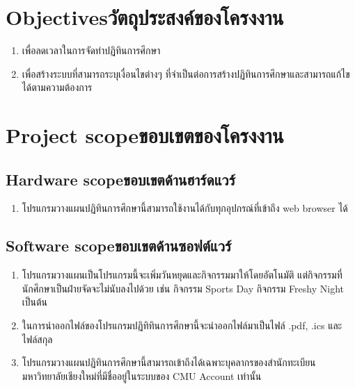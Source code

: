 \section{\ifenglish Objectives\else วัตถุประสงค์ของโครงงาน\fi}
\begin{enumerate}
    \item เพื่อลดเวลาในการจัดทำปฏิทินการศึกษา
    \item เพื่อสร้างระบบที่สามารถระบุเงื่อนไขต่างๆ ที่จำเป็นต่อการสร้างปฏิทินการศึกษาและสามารถแก้ไขได้ตามความต้องการ
\end{enumerate}

\section{\ifenglish Project scope\else ขอบเขตของโครงงาน\fi}

\subsection{\ifenglish Hardware scope\else ขอบเขตด้านฮาร์ดแวร์\fi}
\begin{enumerate}
\item โปรแกรมวางแผนปฏิทินการศึกษานี้สามารถใช้งานได้กับทุกอุปกรณ์ที่เข้าถึง web browser ได้ 
\end{enumerate}

\subsection{\ifenglish Software scope\else ขอบเขตด้านซอฟต์แวร์\fi}
\begin{enumerate}
\item โปรแกรมวางแผนเป็นโปรแกรมนี้จะเพิ่มวันหยุดและกิจกรรมมาให้โดยอัตโนมัติ แต่กิจกรรมที่นักศึกษาเป็นฝ่ายจัดจะไม่นับลงไปด้วย เช่น กิจกรรม Sports Day กิจกรรม Freshy Night เป็นต้น
\item ในการนำออกไฟล์ของโปรแกรมปฏิทิทินการศึกษานี้จะนำออกไฟล์มาเป็นไฟล์ .pdf, .ics และ ไฟล์สกุล 
\item โปรแกรมวางแผนปฏิทินการศึกษานี้สามารถเข้าถึงได้เฉพาะบุคลากรของสำนักทะเบียน \\ มหาวิทยาลัยเชียงใหม่ที่มีชื่ออยู่ในระบบของ CMU Account เท่านั้น   
\end{enumerate}

